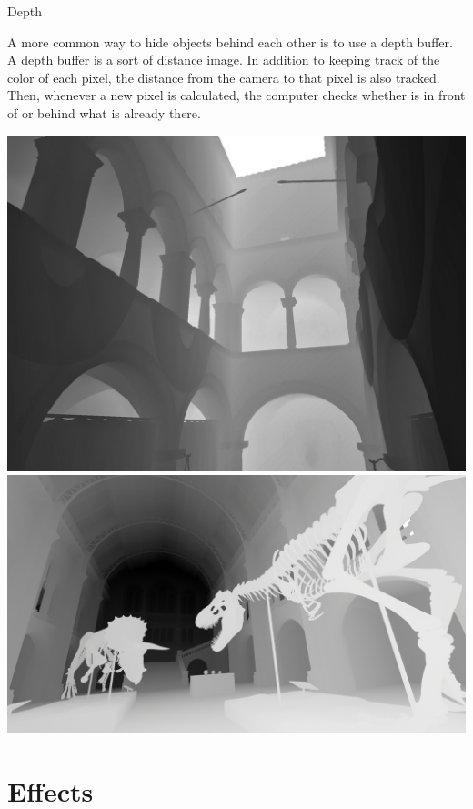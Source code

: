 \documentclass{lug}
\newcommand{\splitslide}[4]{
    \noindent
    \begin{minipage}{#1 \textwidth - #2 }
        #3
    \end{minipage}%
    \hspace{ \dimexpr #2 * 2 \relax }%
    \begin{minipage}{\textwidth - #1 \textwidth - #2 }
        #4
    \end{minipage}
}
\begin{document}
\begin{frame}{Depth}
    \splitslide{0.65}{.7em}{
        \small

        A more common way to hide objects behind each other is to use a depth
        buffer. A depth buffer is a sort of distance image. In addition to
        keeping track of the color of each pixel, the distance from the camera
        to that pixel is also tracked. Then, whenever a new pixel is
        calculated, the computer checks whether is in front of or behind what
        is already there.

    }{
        \includegraphics[width=\textwidth]{graphics/zbuffer2} \\
        \includegraphics[width=\textwidth]{graphics/zbuffer}
    }
\end{frame}

\section{Effects}
\end{document}
